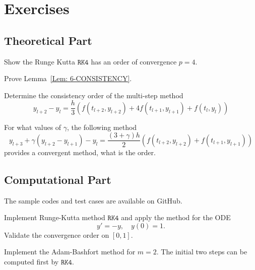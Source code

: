 \section{Exercises}
\subsection{Theoretical Part}
\begin{problem}
    Show the Runge Kutta $\texttt{RK4}$ has an order of convergence $p=4$.
\end{problem}
\begin{problem}
    Prove Lemma~\ref{Lem: 6-CONSISTENCY}.
\end{problem}
\begin{problem}
    Determine the consistency order of the multi-step method 
    \begin{equation}
        y_{l+2} - y_{l} = \frac{h}{3} \left( f(t_{l+2}, y_{l+2}) + 4 f(t_{l+1}, y_{l+1}) + f(t_l, y_l) \right)
    \end{equation}
\end{problem}
\begin{problem}
    For what values of $\gamma$, the following method
    \begin{equation}
        y_{l+3} + \gamma(y_{l+2} - y_{l+1}) - y_{l} = \frac{(3 + \gamma) h}{2} \left( f(t_{l+2}, y_{l+2}) + f(t_{l+1}, y_{l+1}) \right)
    \end{equation} 
    provides a convergent method, what is the order.
\end{problem}
\subsection{Computational Part}
The sample codes and test cases are available on GitHub. 
\begin{problem}
    Implement Runge-Kutta method $\texttt{RK4}$ and apply the method for the ODE 
    \begin{equation}
        y' = - y,\quad y(0) = 1.
    \end{equation}
    Validate the convergence order on $[0, 1]$.
\end{problem}
\begin{problem}
    Implement the Adam-Bashfort method for $m=2$. The initial two steps can be computed first by $\texttt{RK4}$.
\end{problem}

